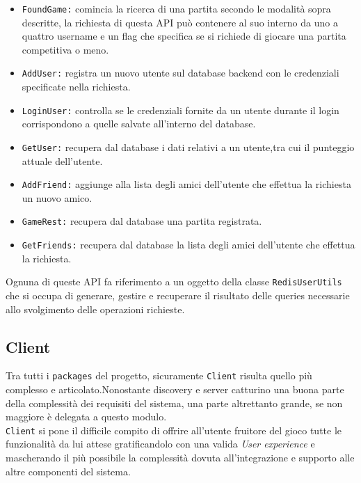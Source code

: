  \begin{itemize}
   \item{\texttt{FoundGame:}} comincia la ricerca di una partita secondo le modalità sopra descritte, la richiesta di questa API può contenere al suo interno da uno a quattro username e un flag che specifica se si richiede di giocare una partita competitiva o meno.

   \item{\texttt{AddUser:}} registra un nuovo utente sul database backend con le credenziali specificate nella richiesta.

   \item{\texttt{LoginUser:}} controlla se le credenziali fornite da un utente durante il login corrispondono a quelle salvate all'interno del database.

   \item{\texttt{GetUser:}} recupera dal database i dati relativi a un utente,tra cui il punteggio attuale dell'utente.

   \item{\texttt{AddFriend:}} aggiunge alla lista degli amici dell'utente che effettua la richiesta un nuovo amico.

    \item{\texttt{GameRest:}} recupera dal database una partita registrata.

    \item{\texttt{GetFriends:}} recupera dal database la lista degli amici dell'utente che effettua la richiesta.
 \end{itemize}

 Ognuna di queste API fa riferimento a un oggetto della classe \texttt{RedisUserUtils} che si occupa di generare, gestire e recuperare il risultato delle queries necessarie allo svolgimento delle operazioni richieste.

  \subsection {Client}\label{subsec:details:client}
  Tra tutti i \texttt{packages} del progetto, sicuramente \texttt{Client} risulta quello più complesso e articolato.Nonostante discovery e server catturino una buona parte della complessità dei requisiti del sistema, una parte altrettanto grande, se non maggiore è delegata a questo modulo.\\
  \texttt{Client} si pone il difficile compito di offrire all'utente fruitore del gioco tutte le funzionalità da lui attese gratificandolo con una valida \textit{User experience} e mascherando il più possibile la complessità dovuta all'integrazione e supporto alle altre componenti del sistema.

